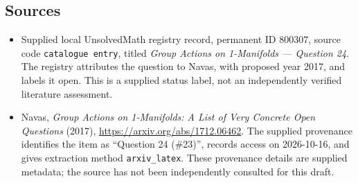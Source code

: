 \documentclass[11pt]{article}
\begin{document}
\subsection{Sources}
\begin{itemize}
\item Supplied local UnsolvedMath registry record, permanent ID \(800307\), source code \texttt{catalogue entry}, titled \emph{Group Actions on 1-Manifolds --- Question 24}. The registry attributes the question to Navas, with proposed year 2017, and labels it open. This is a supplied status label, not an independently verified literature assessment.
\item Navas, \emph{Group Actions on 1-Manifolds: A List of Very Concrete Open Questions} (2017), \url{https://arxiv.org/abs/1712.06462}. The supplied provenance identifies the item as ``Question 24 (\#23)'', records access on 2026-10-16, and gives extraction method \texttt{arxiv\_latex}. These provenance details are supplied metadata; the source has not been independently consulted for this draft.
\end{itemize}
\end{document}
